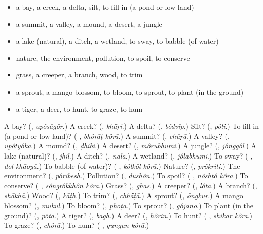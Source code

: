 \begin{itemize}
\raggedright
  \item a bay, a creek, a delta, silt, to fill in (a pond or low land)
  \item a summit, a valley, a mound, a desert, a jungle
  \item a lake (natural), a ditch, a wetland, to sway, to babble (of water)
  \item nature, the environment, pollution, to spoil, to conserve
  \item grass, a creeper, a branch, wood, to trim
  \item a sprout, a mango blossom, to bloom, to sprout, to plant (in the ground)
  \item a tiger, a deer, to hunt, to graze, to hum
\end{itemize}

\begin{tcolorbox}[breakable,colback=teal!4,colframe=teal!35!black,title={Before you move on}]
A bay? (\textbf{}, \emph{upôsāgôr}.) A creek? (\textbf{}, \emph{khā̃ṛi}.) A delta? (\textbf{}, \emph{bôdvīp}.) Silt? (\textbf{}, \emph{pôli}.) To fill in (a pond or low land)? (\textbf{ }, \emph{bhôrāṭ kôrā}.) A summit? (\textbf{}, \emph{chūṛā}.) A valley? (\textbf{}, \emph{upôtyôkā}.) A mound? (\textbf{}, \emph{ḍhibi}.) A desert? (\textbf{}, \emph{môrubhūmi}.) A jungle? (\textbf{}, \emph{jônggôl}.) A lake (natural)? (\textbf{}, \emph{jhil}.) A ditch? (\textbf{}, \emph{nālā}.) A wetland? (\textbf{}, \emph{jôlābhūmi}.) To sway? (\textbf{ }, \emph{dol khāoyā}.) To babble (of water)? (\textbf{ }, \emph{kôlkôl kôrā}.) Nature? (\textbf{}, \emph{prôkriti}.) The environment? (\textbf{}, \emph{pôribesh}.) Pollution? (\textbf{}, \emph{dūshôn}.) To spoil? (\textbf{ }, \emph{nôshṭô kôrā}.) To conserve? (\textbf{ }, \emph{sôngrôkkhôn kôrā}.) Grass? (\textbf{}, \emph{ghās}.) A creeper? (\textbf{}, \emph{lôtā}.) A branch? (\textbf{}, \emph{shākhā}.) Wood? (\textbf{}, \emph{kāṭh}.) To trim? (\textbf{}, \emph{chhā̃ṭā}.) A sprout? (\textbf{}, \emph{ôngkur}.) A mango blossom? (\textbf{}, \emph{mukul}.) To bloom? (\textbf{}, \emph{phoṭā}.) To sprout? (\textbf{}, \emph{gôjāno}.) To plant (in the ground)? (\textbf{}, \emph{põtā}.) A tiger? (\textbf{}, \emph{bāgh}.) A deer? (\textbf{}, \emph{hôrin}.) To hunt? (\textbf{ }, \emph{shikār kôrā}.) To graze? (\textbf{}, \emph{chôrā}.) To hum? (\textbf{ }, \emph{gungun kôrā}.)
\end{tcolorbox}
